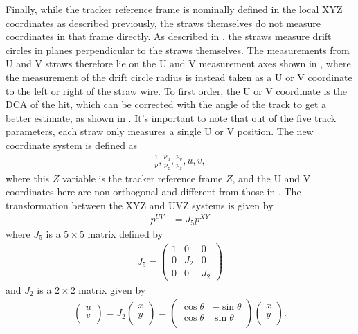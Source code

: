 Finally, while the tracker reference frame is nominally defined in the local XYZ coordinates as described previously, the straws themselves do not measure coordinates in that frame directly. As described in , the straws measure drift circles in planes perpendicular to the straws themselves. The measurements from U and V straws therefore lie on the U and V measurement axes shown in , where the measurement of the drift circle radius is instead taken as a U or V coordinate to the left or right of the straw wire. To first order, the U or V coordinate is the DCA of the hit, which can be corrected with the angle of the track to get a better estimate, as shown in . It's important to note that out of the five track parameters, each straw only measures a single U or V position. The new coordinate system is defined as
        \begin{align} \label{eq:trackermeasurementframe}
            \frac{1}{p}, \frac{p_{u}}{p_{z}}, \frac{p_{v}}{p_{z}}, u, v,
        \end{align}
where this $Z$ variable is the tracker reference frame $Z$, and the U and V coordinates here are non-orthogonal and different from those in . The transformation between the XYZ and UVZ systems is given by
    \begin{align}
        p^{UV} &= J_{5} p^{XY}
    \end{align}
where $J_{5}$ is a $5 \times 5$ matrix defined by
        \begin{align}
            J_{5} = 
            \begin{pmatrix}
                1 & 0 & 0 \\
                0 & J_{2} & 0 \\
                0 & 0 & J_{2}
            \end{pmatrix}
        \end{align}
and $J_{2}$ is a $2 \times 2$ matrix given by
        \begin{align}
            \begin{pmatrix}
                u \\
                v \\
            \end{pmatrix} =
            J_{2}
            \begin{pmatrix}
                x \\
                y \\
            \end{pmatrix} =
            \begin{pmatrix}
                \cos{\theta} & -\sin{\theta} \\
                \cos{\theta} & \sin{\theta} \\
            \end{pmatrix}
            \begin{pmatrix}
                x \\
                y \\
            \end{pmatrix}.
        \end{align}
